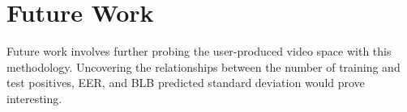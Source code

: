 \section{Future Work}

Future work involves further probing the user-produced video space with this methodology.
Uncovering the relationships between the number of training and test positives, EER, and BLB predicted standard deviation would prove interesting. 